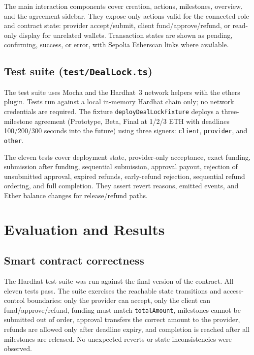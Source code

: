 \documentclass[12pt,a4paper]{article}
\begin{document}
The main interaction components cover creation, actions, milestones, overview,
and the agreement sidebar. They expose only actions valid for the connected role
and contract state: provider accept/submit, client fund/approve/refund, or
read-only display for unrelated wallets. Transaction states are shown as pending,
confirming, success, or error, with Sepolia Etherscan links where available.

\subsection{Test suite (\texttt{test/DealLock.ts})}

The test suite uses Mocha and the Hardhat~3 network helpers with the ethers
plugin.
Tests run against a local in-memory Hardhat chain only; no network credentials
are required.
The fixture \texttt{deployDealLockFixture} deploys a three-milestone agreement
(Prototype, Beta, Final at 1/2/3 ETH with deadlines 100/200/300 seconds into the
future) using three signers: \texttt{client}, \texttt{provider}, and
\texttt{other}.

The eleven tests cover deployment state, provider-only acceptance, exact funding,
submission after funding, sequential submission, approval payout, rejection of
unsubmitted approval, expired refunds, early-refund rejection, sequential refund
ordering, and full completion. They assert revert reasons, emitted events, and
Ether balance changes for release/refund paths.

\newpage
\section{Evaluation and Results}
\label{sec:evaluation}

\subsection{Smart contract correctness}

The Hardhat test suite was run against the final version of the contract.
All eleven tests pass.
The suite exercises the reachable state transitions and access-control
boundaries: only the provider can accept, only the client can fund/approve/refund,
funding must match \texttt{totalAmount}, milestones cannot be submitted out of
order, approval transfers the correct amount to the provider, refunds are allowed
only after deadline expiry, and completion is reached after all milestones are
released. No unexpected reverts or state inconsistencies were observed.
\end{document}

